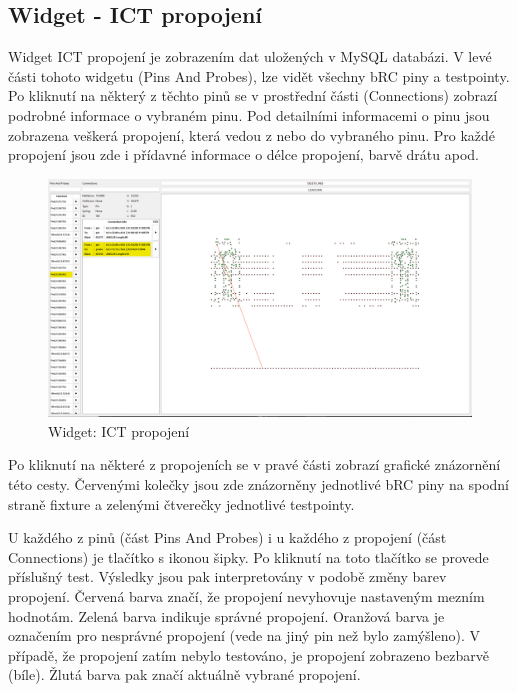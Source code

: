 \subsection{Widget - ICT propojení}
Widget ICT propojení je zobrazením dat uložených v MySQL databázi. V levé části tohoto widgetu (Pins And Probes), lze vidět všechny
bRC piny a testpointy. Po kliknutí na některý z těchto pinů se v prostřední části (Connections) zobrazí podrobné informace o vybraném pinu.
Pod detailními informacemi o pinu jsou zobrazena veškerá propojení,
která vedou z nebo do vybraného pinu. Pro každé propojení jsou zde i přídavné
informace o délce propojení, barvě drátu apod.\par
\begin{figure}[ht!]
    \centering
    \includegraphics[height = 0.31\textheight]{obrazky/PC_APP_dataViewer.png}
    \caption{Widget:  ICT propojení}
    \label{fig: PCAPP ICT propojeni}
\end{figure}
\clearpage
Po kliknutí na některé z propojeních se v pravé části zobrazí grafické znázornění této cesty. Červenými kolečky jsou zde znázorněny jednotlivé bRC piny
na spodní straně fixture a zelenými čtverečky jednotlivé testpointy.\par

U každého z pinů (část Pins And Probes) i u každého z propojení (část Connections) je tlačítko s ikonou šipky. Po kliknutí na toto tlačítko
se provede příslušný test. Výsledky jsou pak interpretovány v podobě změny barev propojení. Červená barva značí, že propojení nevyhovuje nastaveným mezním hodnotám.
Zelená barva indikuje správné propojení. Oranžová barva je označením pro nesprávné propojení (vede na jiný pin než bylo zamýšleno).
V případě, že propojení zatím nebylo testováno, je propojení zobrazeno bezbarvě (bíle). Žlutá barva pak značí aktuálně vybrané propojení.

